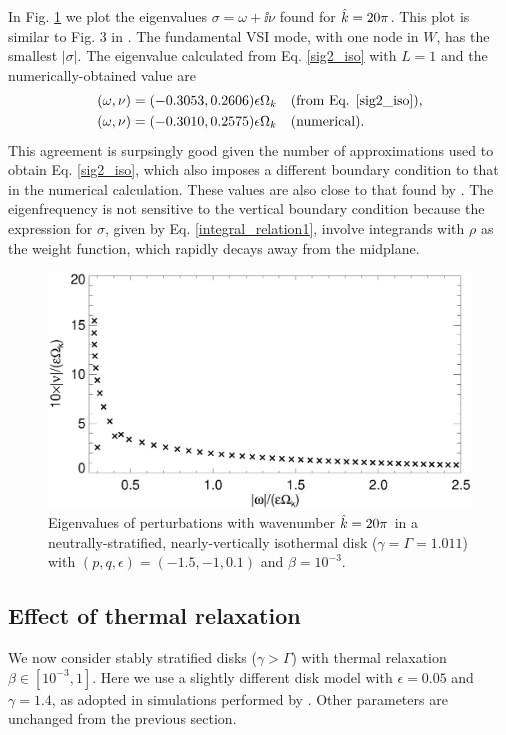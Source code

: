 In Fig. \ref{lowfreq_eigen} we plot the eigenvalues 
$\sigma = \omega + \ii\nu$ found for $\hat{k}=20\pi$. This plot is
similar to Fig. 3 in \cite{mcnally14}. The fundamental
VSI mode, with one node in $W$, has the smallest $|\sigma|$. The
eigenvalue calculated from Eq. \ref{sig2_iso} with $L=1$ and the 
numerically-obtained value are  
\begin{align*}
  (\omega,\nu) = (-0.3053,0.2606)\epsilon\Omega_k &\quad \text{(from
    Eq. \ref{sig2_iso})},\\
  (\omega,\nu) = (-0.3010,0.2575) \epsilon \Omega_k &\quad \text{(numerical)}.
\end{align*}
This agreement is surpsingly good given the number of approximations
used to obtain Eq. \ref{sig2_iso}, which also imposes a different
boundary condition to that in the numerical calculation. These values
are also close to that found by \cite{mcnally14}. The eigenfrequency
is not sensitive to the vertical boundary condition because the
expression for $\sigma$, given by Eq. \ref{integral_relation1},
involve integrands with $\rho$ as the   weight function, which rapidly
decays away from the midplane. 

\begin{figure}
  \includegraphics[width=\linewidth]{figures/eigenvalues_iso}
  \caption{Eigenvalues of perturbations with wavenumber $\hat{k}=20\pi$
    in a neutrally-stratified, nearly-vertically isothermal disk
    ($\gamma=\Gamma=1.011$) with $(p,q,\epsilon)=(-1.5,-1,0.1)$ and
    $\beta=10^{-3}$. \label{lowfreq_eigen} 
  }
\end{figure}

\subsection{Effect of thermal relaxation}
We now consider stably stratified disks ($\gamma > \Gamma$) with
thermal relaxation $\beta\in[10^{-3},1]$. Here we use a slightly  
different disk model with $\epsilon=0.05$ and $\gamma=1.4$, as 
adopted in simulations performed by \cite{nelson13}. Other parameters 
are unchanged from the previous section.  

